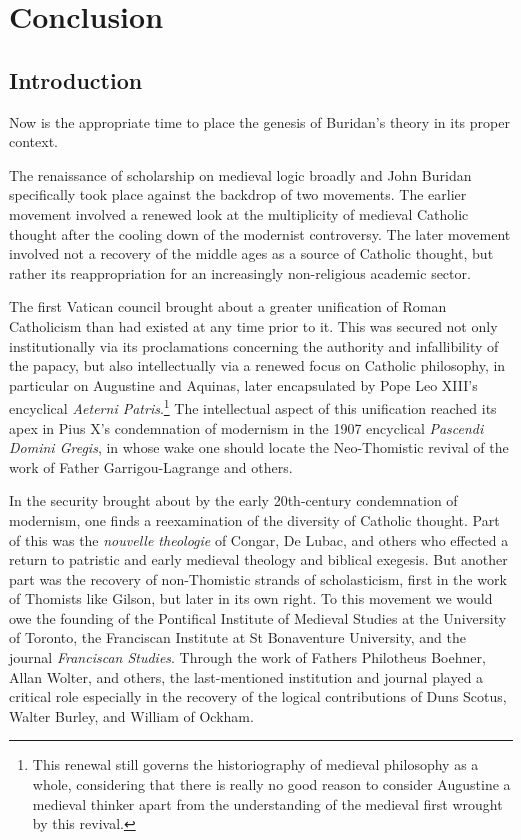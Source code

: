 \chapter{Conclusion}
\section{Introduction}
Now is the appropriate time to place the genesis of Buridan's theory in its proper context. 

The renaissance of scholarship on medieval logic broadly and John Buridan specifically took place against the backdrop of two movements. The earlier movement involved a renewed look at the multiplicity of medieval Catholic thought after the cooling down of the modernist controversy. The later movement involved not a recovery of the middle ages as a source of Catholic thought, but rather its reappropriation for an increasingly non-religious academic sector.

The first Vatican council brought about a greater unification of Roman Catholicism than had existed at any time prior to it. This was secured not only institutionally via its proclamations concerning the authority and infallibility of the papacy, but also intellectually via a renewed focus on Catholic philosophy, in particular on Augustine and Aquinas, later encapsulated by Pope Leo XIII's encyclical \textit{Aeterni Patris}.\footnote{This renewal still governs the historiography of medieval philosophy as a whole, considering that there is really no good reason to consider Augustine a medieval thinker apart from the understanding of the medieval first wrought by this revival.} The intellectual aspect of this unification reached its apex in Pius X's condemnation of modernism in the 1907 encyclical \textit{Pascendi Domini Gregis}, in whose wake one should locate the Neo-Thomistic revival of the work of Father Garrigou-Lagrange and others. 

In the security brought about by the early 20th-century condemnation of modernism, one finds a reexamination of the diversity of Catholic thought. Part of this was the \textit{nouvelle theologie} of Congar, De Lubac, and others who effected a return to patristic and early medieval theology and biblical exegesis. But another part was the recovery of non-Thomistic strands of scholasticism, first in the work of Thomists like Gilson, but later in its own right. To this movement we would owe the founding of the Pontifical Institute of Medieval Studies at the University of Toronto, the Franciscan Institute at St Bonaventure University, and the journal \textit{Franciscan Studies}. Through the work of Fathers Philotheus Boehner, Allan Wolter, and others, the last-mentioned institution and journal played a critical role especially in the recovery of the logical contributions of Duns Scotus, Walter Burley, and William of Ockham.

